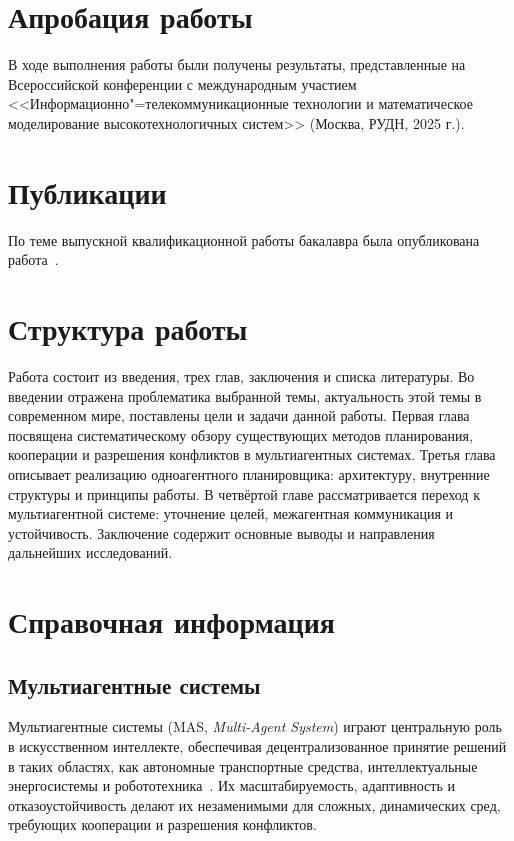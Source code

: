 \section*{Апробация работы}

В ходе выполнения работы были получены результаты, представленные на
Всероссийской конференции с международным участием
<<Информационно"=телекоммуникационные технологии
и математическое моделирование высокотехнологичных систем>> (Москва, РУДН, 2025 г.).

\section*{Публикации}

По теме выпускной квалификационной работы бакалавра была опубликована работа~\cite{ittmm}.

\section*{Структура работы}

Работа состоит из введения, трех глав, заключения и списка литературы.
Во введении отражена проблематика выбранной
темы, актуальность этой темы в современном мире,
поставлены цели и задачи данной работы.
Первая глава посвящена систематическому обзору существующих методов планирования, кооперации и разрешения конфликтов в мультиагентных системах. Третья глава описывает реализацию одноагентного планировщика: архитектуру, внутренние структуры и принципы работы. В четвёртой главе рассматривается переход к мультиагентной системе: уточнение целей, межагентная коммуникация и устойчивость. Заключение содержит основные выводы и направления дальнейших исследований.

\section*{Справочная информация}

\subsection*{Мультиагентные системы}

Мультиагентные системы (MAS, \textit{Multi-Agent System}) играют центральную роль в искусственном интеллекте,
обеспечивая децентрализованное принятие решений в таких областях, как автономные
транспортные средства, интеллектуальные энергосистемы и робототехника~\cite{Torre_o_2017}.
Их масштабируемость, адаптивность и отказоустойчивость делают их незаменимыми
для сложных, динамических сред, требующих кооперации и разрешения конфликтов.

